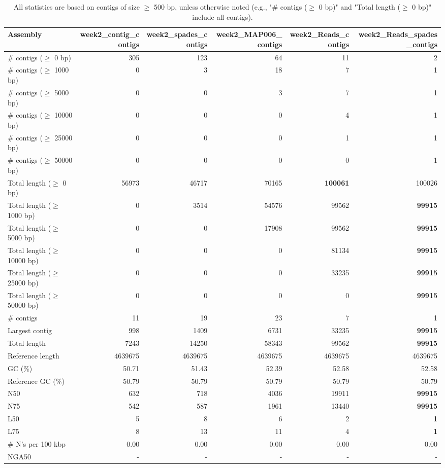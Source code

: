 \documentclass[12pt,a4paper]{article}
\begin{document}
\begin{table}[ht]
\begin{center}
\caption{All statistics are based on contigs of size $\geq$ 500 bp, unless otherwise noted (e.g., "\# contigs ($\geq$ 0 bp)" and "Total length ($\geq$ 0 bp)" include all contigs).}
\begin{tabular}{|l*{5}{|r}|}
\hline
Assembly & week2\_contig\_contigs & week2\_spades\_contigs & week2\_MAP006\_contigs & week2\_Reads\_contigs & week2\_Reads\_spades\_contigs \\ \hline
\# contigs ($\geq$ 0 bp) & 305 & 123 & 64 & 11 & 2 \\ \hline
\# contigs ($\geq$ 1000 bp) & 0 & 3 & 18 & 7 & 1 \\ \hline
\# contigs ($\geq$ 5000 bp) & 0 & 0 & 3 & 7 & 1 \\ \hline
\# contigs ($\geq$ 10000 bp) & 0 & 0 & 0 & 4 & 1 \\ \hline
\# contigs ($\geq$ 25000 bp) & 0 & 0 & 0 & 1 & 1 \\ \hline
\# contigs ($\geq$ 50000 bp) & 0 & 0 & 0 & 0 & 1 \\ \hline
Total length ($\geq$ 0 bp) & 56973 & 46717 & 70165 & {\bf 100061} & 100026 \\ \hline
Total length ($\geq$ 1000 bp) & 0 & 3514 & 54576 & 99562 & {\bf 99915} \\ \hline
Total length ($\geq$ 5000 bp) & 0 & 0 & 17908 & 99562 & {\bf 99915} \\ \hline
Total length ($\geq$ 10000 bp) & 0 & 0 & 0 & 81134 & {\bf 99915} \\ \hline
Total length ($\geq$ 25000 bp) & 0 & 0 & 0 & 33235 & {\bf 99915} \\ \hline
Total length ($\geq$ 50000 bp) & 0 & 0 & 0 & 0 & {\bf 99915} \\ \hline
\# contigs & 11 & 19 & 23 & 7 & 1 \\ \hline
Largest contig & 998 & 1409 & 6731 & 33235 & {\bf 99915} \\ \hline
Total length & 7243 & 14250 & 58343 & 99562 & {\bf 99915} \\ \hline
Reference length & 4639675 & 4639675 & 4639675 & 4639675 & 4639675 \\ \hline
GC (\%) & 50.71 & 51.43 & 52.39 & 52.58 & 52.58 \\ \hline
Reference GC (\%) & 50.79 & 50.79 & 50.79 & 50.79 & 50.79 \\ \hline
N50 & 632 & 718 & 4036 & 19911 & {\bf 99915} \\ \hline
N75 & 542 & 587 & 1961 & 13440 & {\bf 99915} \\ \hline
L50 & 5 & 8 & 6 & 2 & {\bf 1} \\ \hline
L75 & 8 & 13 & 11 & 4 & {\bf 1} \\ \hline
\# N's per 100 kbp & 0.00 & 0.00 & 0.00 & 0.00 & 0.00 \\ \hline
NGA50 & - & - & - & - & - \\ \hline
\end{tabular}
\end{center}
\end{table}
\end{document}
